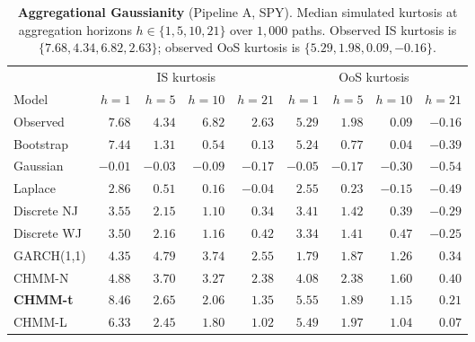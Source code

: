 \begin{table}[t]
\centering
\small
\caption{\textbf{Aggregational Gaussianity} (Pipeline A, SPY). Median simulated kurtosis at aggregation horizons $h \in \{1, 5, 10, 21\}$ over $1{,}000$ paths. Observed IS kurtosis is $\{7.68, 4.34, 6.82, 2.63\}$; observed OoS kurtosis is $\{5.29, 1.98, 0.09, -0.16\}$.}
\label{tab:agg_kurt}
\begin{tabular}{lrrrr|rrrr}
\toprule
 & \multicolumn{4}{c}{IS kurtosis} & \multicolumn{4}{c}{OoS kurtosis} \\
Model & $h = 1$ & $h = 5$ & $h = 10$ & $h = 21$ & $h = 1$ & $h = 5$ & $h = 10$ & $h = 21$ \\
\midrule
Observed    & $7.68$ & $4.34$ & $6.82$ & $2.63$ & $5.29$ & $1.98$ & $0.09$  & $-0.16$ \\
Bootstrap   & $7.44$ & $1.31$ & $0.54$ & $0.13$ & $5.24$ & $0.77$ & $0.04$  & $-0.39$ \\
Gaussian    & $-0.01$& $-0.03$& $-0.09$& $-0.17$& $-0.05$& $-0.17$& $-0.30$ & $-0.54$ \\
Laplace     & $2.86$ & $0.51$ & $0.16$ & $-0.04$& $2.55$ & $0.23$ & $-0.15$ & $-0.49$ \\
Discrete NJ & $3.55$ & $2.15$ & $1.10$ & $0.34$ & $3.41$ & $1.42$ & $0.39$  & $-0.29$ \\
Discrete WJ & $3.50$ & $2.16$ & $1.16$ & $0.42$ & $3.34$ & $1.41$ & $0.47$  & $-0.25$ \\
GARCH(1,1)  & $4.35$ & $4.79$ & $3.74$ & $2.55$ & $1.79$ & $1.87$ & $1.26$  & $0.34$ \\
CHMM-N      & $4.88$ & $3.70$ & $3.27$ & $2.38$ & $4.08$ & $2.38$ & $1.60$  & $0.40$ \\
\textbf{CHMM-t} & $\mathbf{8.46}$ & $\mathbf{2.65}$ & $\mathbf{2.06}$ & $\mathbf{1.35}$ & $\mathbf{5.55}$ & $\mathbf{1.89}$ & $\mathbf{1.15}$ & $\mathbf{0.21}$ \\
CHMM-L      & $6.33$ & $2.45$ & $1.80$ & $1.02$ & $5.49$ & $1.97$ & $1.04$  & $0.07$ \\
\bottomrule
\end{tabular}
\end{table}

